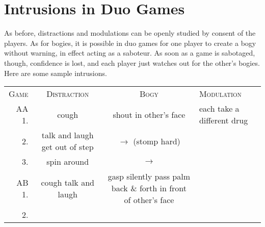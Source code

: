 \section*{Intrusions in Duo Games}

As before, distractions and modulations can be openly studied by 
consent of the players. As for bogies, it is possible in duo games for one 
player to create a bogy without warning, in effect acting as a saboteur. As 
soon as a game is sabotaged, though, confidence is lost, and each player just 
watches out for the other's bogies. Here are some sample intrusions. 

\begin{tabular}{ r c c p{2in} }
	\textsc{Game} & \textsc{Distraction} & \textsc{Bogy} & \textsc{Modulation} \\
	AA 1. & cough & shout in other's face & each take a different drug \\
	2. & talk and laugh \linebreak get out of step & $\rightarrow$ \linebreak (stomp hard) & \\
	3. & spin around & $\rightarrow$ & \\
	AB 1. & cough \linebreak talk and laugh & gasp \linebreak silently pass palm back \& forth in front of other's face & \\
	2. & & & \\
\end{tabular}


